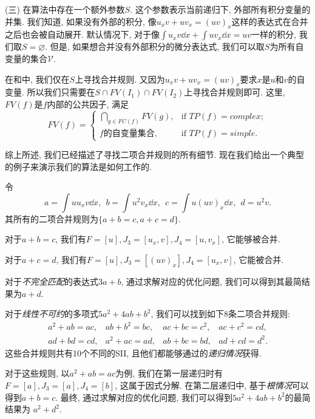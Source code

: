 (三) 在算法中存在一个额外参数$S$. 这个参数表示当前递归下, 外部所有积分变量的并集. 我们知道, 如果没有外部的积分, 像$u_x v + u v_x = (uv)_x$这样的表达式在合并之后也会被自动展开. 默认情况下, 对于像$\int\!{u_x v\dd x} + \int\!{u v_x\dd x} = uv$一样的积分, 我们取$S=\varnothing$. 但是, 如果想合并没有外部积分的微分表达式, 我们可以取$S$为所有自变量的集合$\mathcal{V}$.  

在和中, 我们仅在$S$上寻找合并规则. 又因为$u_x v + u v_x = (uv)_x$要求$x$是$u$和$v$的自变量. 所以我们只需要在$S\cap FV(I_1) \cap FV(I_2)$上寻找合并规则即可. 这里, $FV(f)$是$f$内部的公共因子, 满足
\begin{equation}    
FV(f)=\left\{
\begin{array}{cl}
\bigcap\limits_{g\in FC(f)}{FV(g)}, &\text{if }TP(f)=complex;\\ 
f\text{的自变量集合},          &\text{if }TP(f)=simple.
\end{array}
\right.
\end{equation}

综上所述, 我们已经描述了寻找二项合并规则的所有细节. 现在我们给出一个典型的例子来演示我们的算法是如何工作的.

\begin{example} \label{eg-4-1}
令
\begin{equation}
a=\int\!{uu_xv \dd x},~~b=\int\!{u^2v_x\dd x},~~c=\int\!{u(uv)_x\dd x},~~d=u^2v.
\end{equation}
其所有的二项合并规则为$\{a+b=c,a+c=d\}$. 

对于$a+b=c$, 我们有$F=[u],J_3=[u_x,v],J_4=[u,v_x]$, 它能够被合并.

对于$a+c=d$, 我们有$F=[u],J_3=[(uv)_x],J_4=[u_x,v]$, 它能被合并.  

对于\emph{不完全匹配}的表达式$3a+b$, 通过求解对应的优化问题, 我们可以得到其最简结果为$a+d$.

对于\emph{线性不可约}的多项式$5a^2+4ab+b^2$, 我们可以找到如下8条二项合并规则: 
\begin{equation}
\begin{matrix}
a^2+ab=ac, &ab+b^2=bc, &ac+bc=c^2, &ac+c^2=cd,\\
ad+bd=cd,  &a^2+ac=ad, &ab+bc=bd,  &ad+cd=d^2.
\end{matrix}
\end{equation}
这些合并规则共有10个不同的SII, 且他们都能够通过的\emph{递归情况}获得. 

对于这些规则, 以$a^2+ab=ac$为例, 我们在第一层递归时有$F=[a],J_3=[a],J_4=[b]$, 这属于因式分解. 在第二层递归中, 基于\emph{根情况}可以得到$a+b=c$. 最终, 通过求解对应的优化问题, 我们可以得到$5a^2+4ab+b^2$的最简结果为 $a^2+d^2$.
\end{example}  

